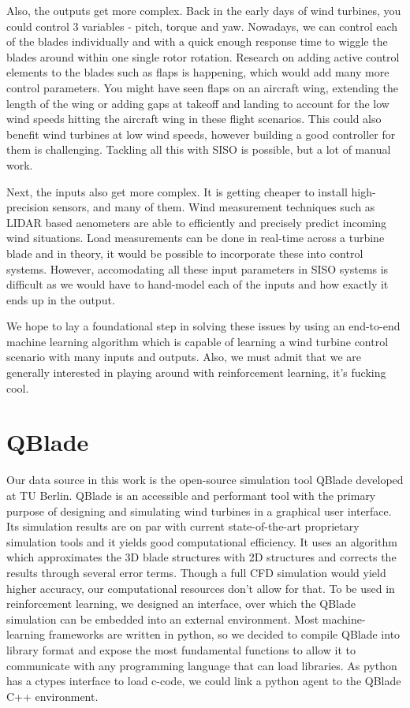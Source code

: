\documentclass[hyperref,beleg]{cgvpub}
\begin{document}
Also, the outputs get more complex. Back in the early days of wind turbines, you could control 3 variables - pitch, torque and yaw. Nowadays, we can control each of the blades individually and with a quick enough response time to wiggle the blades around within one single rotor rotation. Research on adding active control elements to the blades such as flaps is happening, which would add many more control parameters. You might have seen flaps on an aircraft wing, extending the length of the wing or adding gaps at takeoff and landing to account for the low wind speeds hitting the aircraft wing in these flight scenarios. This could also benefit wind turbines at low wind speeds, however building a good controller for them is challenging. Tackling all this with \ac{SISO} is possible, but a lot of manual work.

Next, the inputs also get more complex. It is getting cheaper to install high-precision sensors, and many of them. Wind measurement techniques such as LIDAR based aenometers are able to efficiently and precisely predict incoming wind situations. Load measurements can be done in real-time across a turbine blade and in theory, it would be possible to incorporate these into control systems. However, accomodating all these input parameters in \ac{SISO} systems is difficult as we would have to hand-model each of the inputs and how exactly it ends up in the output.

We hope to lay a foundational step in solving these issues by using an end-to-end machine learning algorithm which is capable of learning a wind turbine control scenario with many inputs and outputs. Also, we must admit that we are generally interested in playing around with reinforcement learning, it's fucking cool.


\section{QBlade}
Our data source in this work is the open-source simulation tool QBlade \cite{martenQBLADEOPENSOURCE2013} developed at TU Berlin. QBlade is an accessible and performant tool with the primary purpose of designing and simulating wind turbines in a graphical user interface. Its simulation results are on par with current state-of-the-art proprietary simulation tools and it yields good computational efficiency. It uses an algorithm which approximates the 3D blade structures with 2D structures and corrects the results through several error terms. Though a full CFD simulation would yield higher accuracy, our computational resources don't allow for that. To be used in reinforcement learning, we designed an interface, over which the QBlade simulation can be embedded into an external environment. Most machine-learning frameworks are written in python, so we decided to compile QBlade into library format and expose the most fundamental functions to allow it to communicate with any programming language that can load libraries. As python has a ctypes interface to load c-code, we could link a python agent to the QBlade C++ environment.
\end{document}
